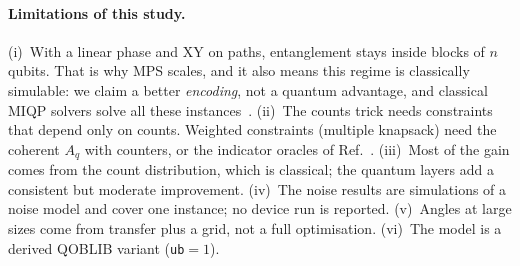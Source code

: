 \paragraph{Limitations of this study.} (i)~With a linear phase and XY on paths, entanglement stays inside blocks of $n$ qubits. That is why MPS scales, and it also means this regime is classically simulable: we claim a better \emph{encoding}, not a quantum advantage, and classical MIQP solvers solve all these instances~\cite{babbush2021}. (ii)~The counts trick needs constraints that depend only on counts. Weighted constraints (multiple knapsack) need the coherent $A_q$ with counters, or the indicator oracles of Ref.~\cite{bucher2025}. (iii)~Most of the gain comes from the count distribution, which is classical; the quantum layers add a consistent but moderate improvement. (iv)~The noise results are simulations of a noise model and cover one instance; no device run is reported. (v)~Angles at large sizes come from transfer plus a grid, not a full optimisation. (vi)~The model is a derived QOBLIB variant (\texttt{ub}$=1$).
